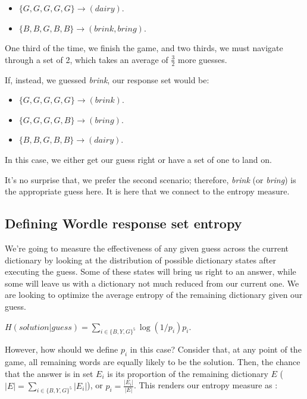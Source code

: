 \documentclass[11pt, oneside]{article} 	%
\begin{document}
\begin{itemize}
\item $\{G, G, G, G, G\} \rightarrow (dairy)$.
\item $\{B, B, G, B, B\} \rightarrow (brink, bring)$.
\end{itemize}

One third of the time, we finish the game, and two thirds, we must navigate through a set of 2, which takes an average of $\frac{3}{2}$ more guesses. 

If, instead, we guessed \emph{brink}, our response set would be:
\begin{itemize}
\item $\{G, G, G, G, G\} \rightarrow (brink)$.
\item $\{G, G, G, G, B\} \rightarrow (bring)$.
\item $\{B, B, G, B, B\} \rightarrow (dairy)$.
\end{itemize}

In this case, we either get our guess right or have a set of one to land on.

It's no surprise that, we prefer the second scenario; therefore, \emph{brink} (or \emph{bring}) is the appropriate guess here. It is here that we connect to the entropy measure.

\subsection{Defining Wordle response set entropy}

We're going to measure the effectiveness of any given guess across the current dictionary by looking at the distribution of possible dictionary states after executing the guess. Some of these states will bring us right to an answer, while some will leave us with a dictionary not much reduced from our current one. We are looking to optimize the average entropy of the remaining dictionary given our guess.

\begin{center}
$H(solution | guess) = \sum_{i \in \{B, Y, G\}^5} \log(1/ p_i) p_i$.
\end{center}

However, how should we define $p_i$ in this case? Consider that, at any point of the game, all remaining words are equally likely to be the solution. Then, the chance that the answer is in set $E_i$ is its proportion of the remaining dictionary $E$ ($|E| =\sum_{i \in \{B, Y, G\}^5} |E_i|$), or $p_i = \frac{|E_i|}{|E|}$. This renders our entropy measure as :
\end{document}
